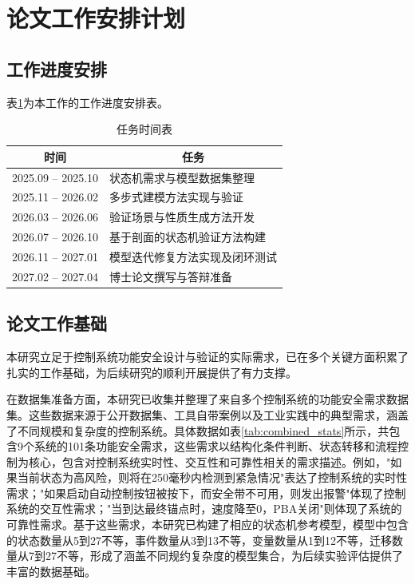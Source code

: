 \section{论文工作安排计划}
\label{section-plan}

\subsection{工作进度安排}
\label{section-plan-arrangement}

表\ref{tab:schedule}为本工作的工作进度安排表。

\begin{table}[htbp]
  \centering
  \begin{tabular}{|c|l|}
    \hline
    \textbf{时间} & \multicolumn{1}{|c|}{\textbf{任务}} \\
    \hline
    2025.09 -- 2025.10 & 状态机需求与模型数据集整理 \\
    \hline
    2025.11 -- 2026.02 & 多步式建模方法实现与验证 \\
    \hline
    2026.03 -- 2026.06 & 验证场景与性质生成方法开发 \\
    \hline
    2026.07 -- 2026.10 & 基于剖面的状态机验证方法构建 \\
    \hline
    2026.11 -- 2027.01 & 模型迭代修复方法实现及闭环测试 \\
    \hline
    2027.02 -- 2027.04 & 博士论文撰写与答辩准备 \\
    \hline
  \end{tabular}
  \caption{任务时间表}
  \label{tab:schedule}
\end{table}


\subsection{论文工作基础}
\label{section-plan-foundation}

本研究立足于控制系统功能安全设计与验证的实际需求，已在多个关键方面积累了扎实的工作基础，为后续研究的顺利开展提供了有力支撑。

在数据集准备方面，本研究已收集并整理了来自多个控制系统的功能安全需求数据集。这些数据来源于公开数据集、工具自带案例以及工业实践中的典型需求，涵盖了不同规模和复杂度的控制系统。具体数据如表\ref{tab:combined_stats}所示，共包含9个系统的101条功能安全需求，这些需求以结构化条件判断、状态转移和流程控制为核心，包含对控制系统实时性、交互性和可靠性相关的需求描述。例如，"如果当前状态为高风险，则将在250毫秒内检测到紧急情况"表达了控制系统的实时性需求；"如果启动自动控制按钮被按下，而安全带不可用，则发出报警"体现了控制系统的交互性需求；"当到达最终锚点时，速度降至0，PBA关闭"则体现了系统的可靠性需求。基于这些需求，本研究已构建了相应的状态机参考模型，模型中包含的状态数量从5到27不等，事件数量从3到13不等，变量数量从1到12不等，迁移数量从7到27不等，形成了涵盖不同规约复杂度的模型集合，为后续实验评估提供了丰富的数据基础。



